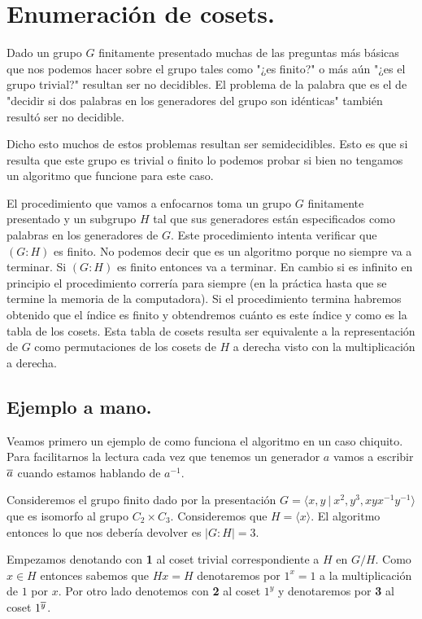 \documentclass[tesis.tex]{subfiles}
\newcommand{\fp}{finitamente presentado }
\begin{document}
\chapter{Enumeración de cosets.}

Dado un grupo $G$ \fp muchas de las preguntas más básicas que nos podemos hacer sobre el grupo tales como "¿es finito?" o más aún "¿es el grupo trivial?" resultan ser no decidibles.
El problema de la palabra que es el de "decidir si dos palabras en los generadores del grupo son idénticas" también resultó ser no decidible.

Dicho esto muchos de estos problemas resultan ser semidecidibles.
Esto es que si resulta que este grupo es trivial o finito lo podemos probar si bien no tengamos un algoritmo que funcione para este caso.

El procedimiento que vamos a enfocarnos toma un grupo $G$ \fp y un subgrupo $H$ tal que sus generadores están especificados como palabras en los generadores de $G$. 
Este procedimiento intenta verificar que $(G:H)$ es finito.
No podemos decir que es un algoritmo porque no siempre va a terminar.
Si $(G:H)$ es finito entonces va a terminar.
En cambio si es infinito en principio el procedimiento correría para siempre (en la práctica hasta que se termine la memoria de la computadora).
Si el procedimiento termina habremos obtenido que el índice es finito y obtendremos cuánto es este índice y como es la tabla de los cosets.
Esta tabla de cosets resulta ser equivalente a la representación de $G$ como permutaciones de los cosets de $H$ a derecha visto con la multiplicación a derecha.

\section{Ejemplo a mano.}

Veamos primero un ejemplo de como funciona el algoritmo en un caso chiquito.
Para facilitarnos la lectura cada vez que tenemos un generador $a$ vamos a escribir $\overline a$ cuando estamos hablando de $a^{-1}$.

Consideremos el grupo finito dado por la presentación $G = \langle x , y \ | \ x^2, y^3, xyx^{-1}y^{-1} \rangle$ que es isomorfo al grupo $C_2 \times C_3$. 
Consideremos que $H = \langle x \rangle $.
El algoritmo entonces lo que nos debería devolver es $|G:H| = 3$.

Empezamos denotando con \textbf{1} al coset trivial correspondiente a $H$ en $G/H$.
Como $x \in H$ entonces sabemos que $Hx = H$ denotaremos por $1^x = 1$ a la multiplicación de $1$ por $x$.
Por otro lado denotemos con \textbf{2} al coset $1^y$ y denotaremos por \textbf{3} al coset $1^{\overline y}$.
\end{document}
